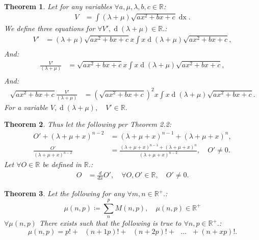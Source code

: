 \documentclass[10pt]{article}
\theoremstyle{plain}
\newtheorem{theorem}{Theorem}[section]
\theoremstyle{definition}
\theoremstyle{remark}
\begin{document}
\begin{theorem}
	Let for any variables $\forall a, \mu, \lambda, b, c \in \mathbb{R}$:
	\begin{align*}
		V &= \int (\lambda + \mu)\sqrt{ax^2 + bx  +c} \operatorname{dx}.
	\end{align*}
	We define three equations for $\forall V', \operatorname{d}(\lambda + \mu) \in \mathbb{R}.$:
	\begin{align*}
		V' &= (\lambda + \mu)\sqrt{ax^2 + bx  +c}x \int x \operatorname{d}(\lambda + \mu)\sqrt{ax^2 + bx  +c},\\
	\end{align*}
	And:
	\begin{align*}
		\frac{V'}{(\lambda + \mu)} &= \sqrt{ax^2 + bx  +c}x \int x \operatorname{d}(\lambda + \mu)\sqrt{ax^2 + bx  +c},\\
	\end{align*}
	And:
	\begin{align*}
		\sqrt{ax^2 + bx  +c}\frac{V'}{(\lambda + \mu)} &= (\sqrt{ax^2 + bx  +c})^{2}x \int x \operatorname{d}(\lambda + \mu)\sqrt{ax^2 + bx  +c}.
	\end{align*}
	For a variable $V, \operatorname{d}(\lambda + \mu), \quad V' \in \mathbb{R}.$
\end{theorem}

\begin{theorem}
	Thus let the following per Theorem 2.2:
	\begin{align*}
		O' + (\lambda + \mu + x)^{n-2} &= (\lambda + \mu + x)^{n-1} + (\lambda + \mu + x)^{n},\\
		\frac{O'}{(\lambda + \mu + x)^{n-2}} &= \frac{(\lambda + \mu + x)^{n-1} + (\lambda + \mu + x)^{n}}{(\lambda + \mu + x)^{n-2}}, \quad O' \neq 0.
	\end{align*}
	Let $\forall O \in \mathbb{R}$ be defined in $\mathbb{R}.$:
	\begin{align*}
		O &= \frac{d}{dx} O', \quad \forall O, O' \in \mathbb{R}, \quad O' \neq 0.
	\end{align*}
\end{theorem}

\begin{theorem}
	Let the following for any $\forall m, n \in \mathbb{R}^{+}.$:
\begin{equation}
    \mu(n, p) \coloneq \sum_{n}^{p} M(n, p), \quad \mu(n, p) \in \mathbb{R}^{+}
\end{equation}
	$\forall \mu(n, p)$ There exists such that the following is true to $\forall n, p \in \mathbb{R}^{+}.$:
\begin{equation}
    \mu(n, p) = p! + \text{ } (n+1p)! + \text{ } (n+2p)! + \text{ } \dots \text{ } + (n+xp)!.
\end{equation}
\end{theorem}
\end{document}
